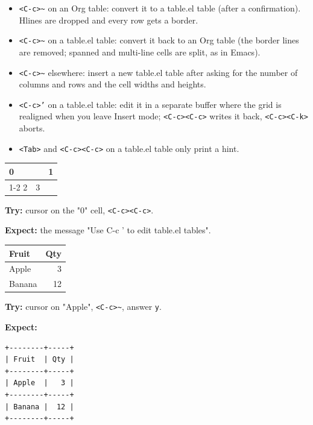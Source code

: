 \begin{itemize}
\item \texttt{<C-c>\textasciitilde{}} on an Org table: convert it to a table.el table (after a
confirmation). Hlines are dropped and every row gets a border.
\item \texttt{<C-c>\textasciitilde{}} on a table.el table: convert it back to an Org table (the border
lines are removed; spanned and multi-line cells are split, as in Emacs).
\item \texttt{<C-c>\textasciitilde{}} elsewhere: insert a new table.el table after asking for the
number of columns and rows and the cell widths and heights.
\item \texttt{<C-c>'} on a table.el table: edit it in a separate buffer where the grid
is realigned when you leave Insert mode; \texttt{<C-c><C-c>} writes it back,
\texttt{<C-c><C-k>} aborts.
\item \texttt{<Tab>} and \texttt{<C-c><C-c>} on a table.el table only print a hint.
\end{itemize}

\begin{center}
\begin{tabular}{|l|l|l|}
\hline
\multicolumn{2}{|l|}{0} & 1 \\
\cline{1-2}
2 & 3 & \\
\hline
\end{tabular}
\end{center}

\textbf{Try:} cursor on the "0" cell, \texttt{<C-c><C-c>}.

\textbf{Expect:} the message "Use C-c ' to edit table.el tables".

\begin{table}[htbp]
\label{tab:org908c9ee}
\centering
\begin{tabular}{lr}
Fruit & Qty\\
\hline
Apple & 3\\
Banana & 12\\
\end{tabular}
\end{table}

\textbf{Try:} cursor on "Apple", \texttt{<C-c>\textasciitilde{}}, answer \texttt{y}.

\textbf{Expect:}
\begin{verbatim}
+--------+-----+
| Fruit  | Qty |
+--------+-----+
| Apple  |   3 |
+--------+-----+
| Banana |  12 |
+--------+-----+
\end{verbatim}

